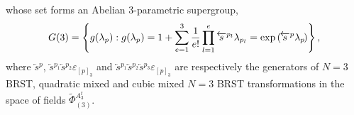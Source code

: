 \documentclass[10pt]{article}
\begin{document}
whose set forms an Abelian  $3$-parametric  supergroup,
\begin{equation}\label{N3finBRST}
G(3) = \left\{g(\lambda_p)
: g(\lambda_p)= 1 + \sum_{e=1}^3 \frac{1}{e!}\prod_{l=1}^e\overleftarrow{s}{}^{p_l}\lambda_{p_l}   = \exp \left( \hspace{-0.1em}\overleftarrow{s%
}{}^{p}\lambda_{p}\hspace{-0.1em}\right)\right\},
\end{equation}
where  $\overleftarrow{s}{}^{p}$, $%
\overleftarrow{s}{}^{p_1}\overleftarrow{s}{}^{p_2} \varepsilon_{[p]_3}$ and  $\overleftarrow{s}{}^{p_1}\overleftarrow{s}{}^{p_2}\overleftarrow{s}{}^{p_3} \varepsilon_{[p]_3}$
are respectively  the generators of $N=3$  BRST,   quadratic  mixed and cubic mixed  $N=3$ BRST  transformations
in the space of fields  $\widetilde{\Phi}{}^{A^t_3}_{(3)}$.
\end{document}
